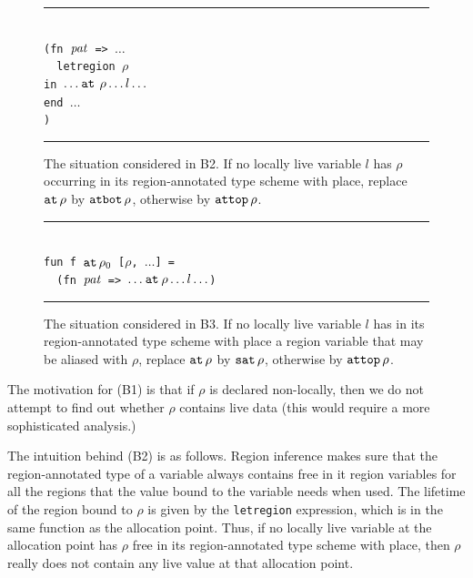 \documentclass[12pt]{book}
\begin{document}
\begin{figure}[htb]
\hrule
\begin{center}
\begin{tabbing}
\\
\hskip3cm\=\tt (fn ${\it pat}$ => $\ldots$\\
       \>\ \ \=\tt letregion $\rho$ \\
       \>    \>\tt in  $\ldots\mathbin{\hbox{\tt at}}\,\rho\ldots l \ldots$\\
       \>    \>\tt end $\ldots$\\
       \>\tt )
\end{tabbing}
\end{center}
\caption{The situation considered in B2. If no locally live variable
  $l$ has $\rho$ occurring in its region-annotated type scheme with
  place, replace $\mathbin{\hbox{\tt at}}\,\rho$ by $\hbox{\tt atbot}\,\rho$, otherwise by
  $\hbox{\tt attop}\,\rho$.}  \medskip \hrule
\label{b2.fig}
\end{figure}

\begin{figure}[htb]
\hrule
\begin{center}
\begin{tabbing}
\\
\hskip3cm\=\tt fun f $\mathbin{\hbox{\tt at}}\,\rho_0$ [$\rho$, $\ldots$] = \\
         \>\tt \ \ \=\tt (fn ${\it pat}$ => $\ldots\mathbin{\hbox{\tt at}}\rho\ldots l\ldots$)
\end{tabbing}
\end{center}
\caption{The situation considered in B3. If no locally live variable
  $l$ has in its region-annotated type scheme with place a region
  variable that may be aliased with $\rho$, replace $\mathbin{\hbox{\tt at}}\,\rho$ by
  $\hbox{\tt sat}\,\rho$, otherwise by $\hbox{\tt attop}\,\rho$.}  \medskip \hrule
\label{b3.fig}
\end{figure}
The motivation for (B1) is that if $\rho$ is declared non-locally,
then we do not attempt to find out whether $\rho$ contains live data
(this would require a more sophisticated analysis.)  

The intuition behind (B2) is as follows. Region inference makes sure
that the region-annotated type of a variable always contains free in
it region variables for all the regions that the value bound to the
variable needs when used. The lifetime of the region bound to $\rho$
is given by the {\tt letregion} expression, which is in the same
function as the allocation point. Thus, if no locally live variable at
the allocation point has $\rho$ free in its region-annotated type
scheme with place, then $\rho$ really does not contain any live value
at that allocation point.
\end{document}
